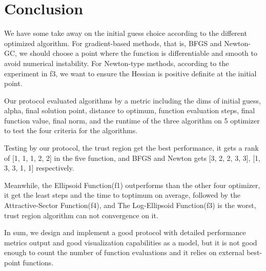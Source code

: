 \documentclass[12pt]{article}
\begin{document}

\section{Conclusion}

We have some take away on the initial guess choice according to the different optimized algorithm. For gradient-based methods, that is, BFGS and Newton-GC, we should choose a point where the function is differentiable and smooth to avoid numerical instability. For Newton-type methods, according to the experiment in f3, we want to ensure the Hessian is positive definite at the initial point. 

Our protocol evaluated algorithms by a metric including the dims of initial guess, alpha, final solution point, distance to optimum, function evaluation steps, final function value, final norm, and the runtime of the three algorithm on 5 optimizer to test the four criteria for the algorithms.

Testing by our protocol, the trust region get the best performance, it gets a rank of [1, 1, 1, 2, 2] in the five function, and BFGS and Newton gets [3, 2, 2, 3, 3], [1, 3, 3, 1, 1] respectively.

Meanwhile, the Ellipsoid Function(f1) outperforms than the other four optimizer, it get the least steps and the time to toptimum on average, followed by the Attractive-Sector Function(f4), and The Log-Ellipsoid Function(f3) is the worst, trust region algorithm can not convergence on it.

In sum, we design and implement a good protocol with detailed performance metrics output and good visualization capabilities as a model, but it is not good enough to count the number of function evaluations and it relies on external best-point functions.



\end{document}
